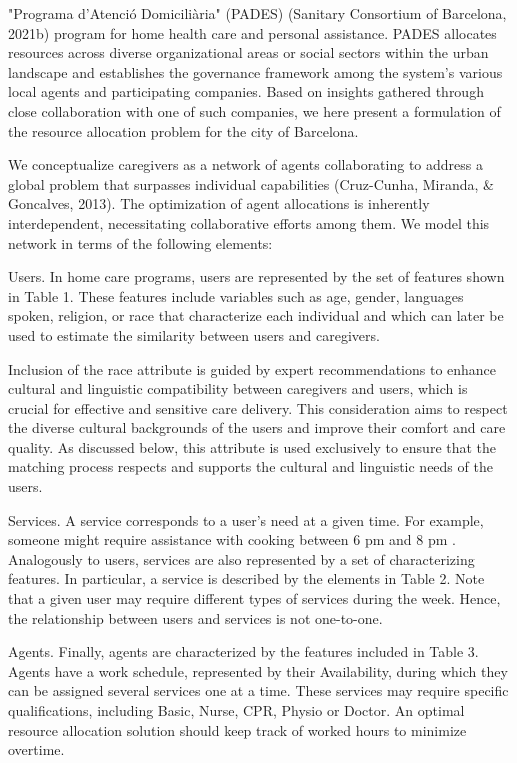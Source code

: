 \documentclass[10pt]{article}
\begin{document}
"Programa d'Atenció Domiciliària" (PADES) (Sanitary Consortium of Barcelona, 2021b) program for home health care and personal assistance. PADES allocates resources across diverse organizational areas or social sectors within the urban landscape and establishes the governance framework among the system's various local agents and participating companies. Based on insights gathered through close collaboration with one of such companies, we here present a formulation of the resource allocation problem for the city of Barcelona.

We conceptualize caregivers as a network of agents collaborating to address a global problem that surpasses individual capabilities (Cruz-Cunha, Miranda, \& Goncalves, 2013). The optimization of agent allocations is inherently interdependent, necessitating collaborative efforts among them. We model this network in terms of the following elements:

Users. In home care programs, users are represented by the set of features shown in Table 1. These features include variables such as age, gender, languages spoken, religion, or race that characterize each individual and which can later be used to estimate the similarity between users and caregivers.

Inclusion of the race attribute is guided by expert recommendations to enhance cultural and linguistic compatibility between caregivers and users, which is crucial for effective and sensitive care delivery. This consideration aims to respect the diverse cultural backgrounds of the users and improve their comfort and care quality. As discussed below, this attribute is used exclusively to ensure that the matching process respects and supports the cultural and linguistic needs of the users.

Services. A service corresponds to a user's need at a given time. For example, someone might require assistance with cooking between 6 pm and 8 pm . Analogously to users, services are also represented by a set of characterizing features. In particular, a service is described by the elements in Table 2. Note that a given user may require different types of services during the week. Hence, the relationship between users and services is not one-to-one.

Agents. Finally, agents are characterized by the features included in Table 3. Agents have a work schedule, represented by their Availability, during which they can be assigned several services one at a time. These services may require specific qualifications, including Basic, Nurse, CPR, Physio or Doctor. An optimal resource allocation solution should keep track of worked hours to minimize overtime.
\end{document}
